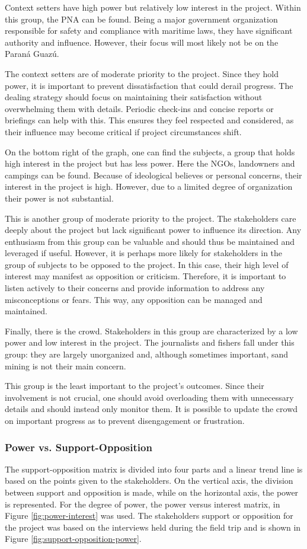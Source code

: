 Context setters have high power but relatively low interest in the project. Within this group, the PNA can be found. Being a major government organization responsible for safety and compliance with maritime laws, they have significant authority and influence. However, their focus will most likely not be on the Paraná Guazú.

The context setters are of moderate priority to the project. Since they hold power, it is important to prevent dissatisfaction that could derail progress. The dealing strategy should focus on maintaining their satisfaction without overwhelming them with details. Periodic check-ins and concise reports or briefings can help with this. This ensures they feel respected and considered, as their influence may become critical if project circumstances shift.

On the bottom right of the graph, one can find the subjects, a group that holds high interest in the project but has less power. Here the NGOs, landowners and campings can be found. Because of ideological believes or personal concerns, their interest in the project is high. However, due to a limited degree of organization their power is not substantial.

This is another group of moderate priority to the project. The stakeholders care deeply about the project but lack significant power to influence its direction. Any enthusiasm from this group can be valuable and should thus be maintained and leveraged if useful. However, it is perhaps more likely for stakeholders in the group of subjects to be opposed to the project. In this case, their high level of interest may manifest as opposition or criticism. Therefore, it is important to listen actively to their concerns and provide information to address any misconceptions or fears. This way, any opposition can be managed and maintained.

Finally, there is the crowd. Stakeholders in this group are characterized by a low power and low interest in the project. The journalists and fishers fall under this group: they are largely unorganized and, although sometimes important, sand mining is not their main concern.

This group is the least important to the project's outcomes. Since their involvement is not crucial, one should avoid overloading them with unnecessary details and should instead only monitor them. It is possible to update the crowd on important progress as to prevent disengagement or frustration.

\subsubsection{Power vs. Support-Opposition}
The support-opposition matrix is divided into four parts and a linear trend line is based on the points given to the stakeholders. On the vertical axis, the division between support and opposition is made, while on the horizontal axis, the power is represented. For the degree of power, the power versus interest matrix, in Figure \ref{fig:power-interest} was used. The stakeholders support or opposition for the project was based on the interviews held during the field trip and is shown in Figure \ref{fig:support-opposition-power}.

